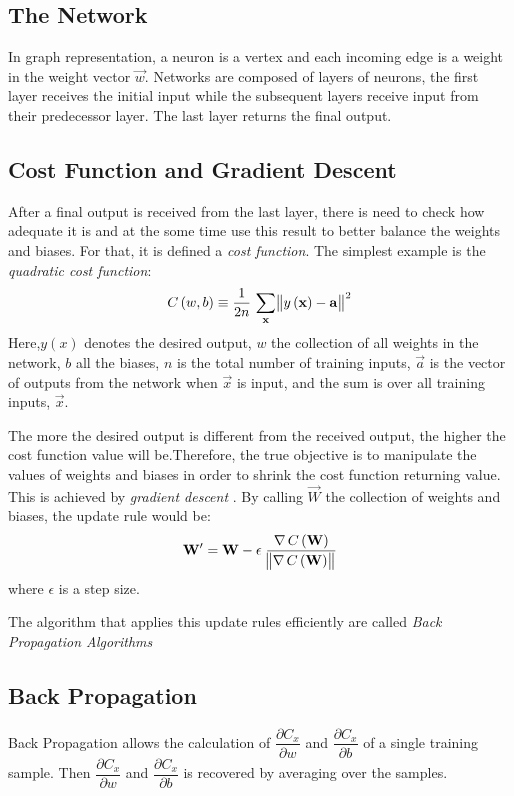 \subsection{The Network}
In graph representation, a neuron is a vertex and each incoming edge is a weight in the weight vector $\vec{w}$. Networks are composed of layers of neurons, the first layer receives the initial input while the subsequent layers receive input from their predecessor layer. The last layer returns the final output.

\subsection{Cost Function and Gradient Descent}
After a final output is received from the last layer, there is need to check how adequate it is and at the some time use this result to better balance the weights and biases. For that, it is defined a \textit{cost function}. The simplest example is the \textit{quadratic cost function}:
\begin{equation}\label{CostFunction}
C\left(w,b\right) \equiv \frac{1}{2n}\,\sum_{\vec{x}}\norm{y\left(\vec{x}\right) - \vec{a}}^{2}
\end{equation} 
Here,$y\left(x\right)$ denotes the desired output, $w$  the collection of all weights in the network, $b$ all the biases, $n$ is the total number of training inputs, $\vec{a}$ is the vector of outputs from the network when $\vec{x}$ is input, and the sum is over all training inputs, $\vec{x}$.

The more the desired output is different from the received output, the higher the cost function value will be.Therefore, the true objective is to manipulate the values of weights and biases in order to shrink the cost function returning value. This is achieved by \textit{gradient descent} \cite{}. By calling $\vec{W}$ the collection of weights and biases, the update rule would be:
\begin{equation}\label{GradientDescent}
\vec{W}^\prime = \vec{W}  - \epsilon\;\frac{\nabla\,C\left(\vec{W}\right)}{\norm{\nabla\,C\left(\vec{W}\right)}}
\end{equation}
where $\epsilon$ is a step size.

The algorithm that applies this update rules efficiently are called \textit{Back Propagation Algorithms}

\subsection{Back Propagation}
Back Propagation allows the calculation of $\dfrac{\partial C_x}{\partial w}$ and $\dfrac{\partial C_x}{\partial b}$ of a single training sample. Then $\dfrac{\partial C_x}{\partial w}$ and $\dfrac{\partial C_x}{\partial b}$ is recovered by averaging over the samples.

